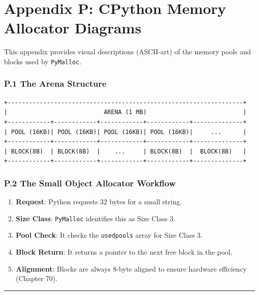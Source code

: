 \hypertarget{appendix-p-cpython-memory-allocator-diagrams}{%
\chapter{Appendix P: CPython Memory Allocator
Diagrams}\label{appendix-p-cpython-memory-allocator-diagrams}}

This appendix provides visual descriptions (ASCII-art) of the memory
pools and blocks used by \passthrough{\lstinline!PyMalloc!}.

\hypertarget{p.1-the-arena-structure}{%
\subsection{P.1 The Arena Structure}\label{p.1-the-arena-structure}}

\begin{lstlisting}
+------------------------------------------------------------------+
|                           ARENA (1 MB)                           |
+------------+------------+------------+------------+--------------+
| POOL (16KB)| POOL (16KB)| POOL (16KB)| POOL (16KB)|     ...      |
+------------+------------+------------+------------+--------------+
| BLOCK(8B)  | BLOCK(8B)  |    ...     | BLOCK(8B)  |  BLOCK(8B)   |
+------------+------------+------------+------------+--------------+
\end{lstlisting}

\hypertarget{p.2-the-small-object-allocator-workflow}{%
\subsection{P.2 The Small Object Allocator
Workflow}\label{p.2-the-small-object-allocator-workflow}}

\begin{enumerate}
\def\labelenumi{\arabic{enumi}.}
\tightlist
\item
  \textbf{Request}: Python requests 32 bytes for a small string.
\item
  \textbf{Size Class}: \passthrough{\lstinline!PyMalloc!} identifies
  this as Size Class 3.
\item
  \textbf{Pool Check}: It checks the \passthrough{\lstinline!usedpools!}
  array for Size Class 3.
\item
  \textbf{Block Return}: It returns a pointer to the next free block in
  the pool.
\item
  \textbf{Alignment}: Blocks are always 8-byte aligned to ensure
  hardware efficiency (Chapter 70).
\end{enumerate}

\begin{center}\rule{0.5\linewidth}{0.5pt}\end{center}
